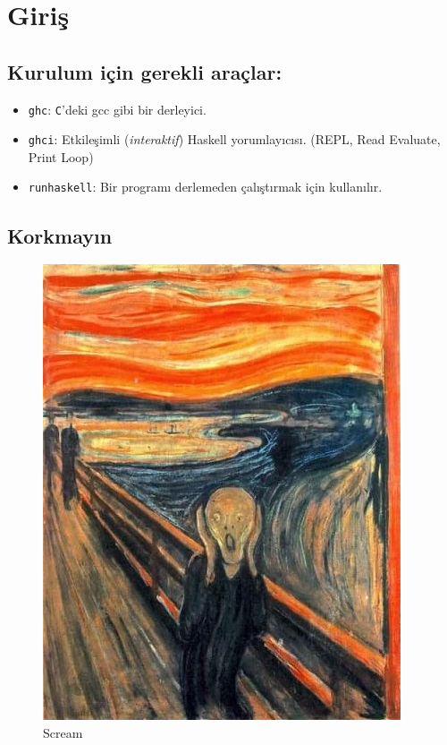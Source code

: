 \documentclass[a4paper,14pt,openany]{extbook} %
\let\emph\textit
\begin{document}
\section{Giriş}\label{giriux15f}


\subsection{Kurulum için gerekli araçlar:}\label{kurulum}

\newenvironment{myitemize}
{ \begin{itemize}
    \setlength{\itemsep}{1pt}
    \setlength{\parskip}{0pt}
    \setlength{\parsep}{0pt}    }
{ \end{itemize}     }

  
\begin{myitemize}
\item \lstinline!ghc!: \lstinline!C!'deki gcc gibi bir derleyici.
\item \lstinline!ghci!: Etkileşimli (\emph{interaktif}) Haskell yorumlayıcısı. {\small(REPL, Read Evaluate, Print Loop)}
\item \lstinline!runhaskell!: Bir programı derlemeden çalıştırmak için kullanılır.
\end{myitemize}

\subsection{Korkmayın}\label{korkmayux131n}

\begin{figure}[htbp]
  \centering
  \includegraphics[width=0.4\linewidth]{img/munch_scream.jpg}
  \caption{Scream}
\end{figure}
\end{document}
